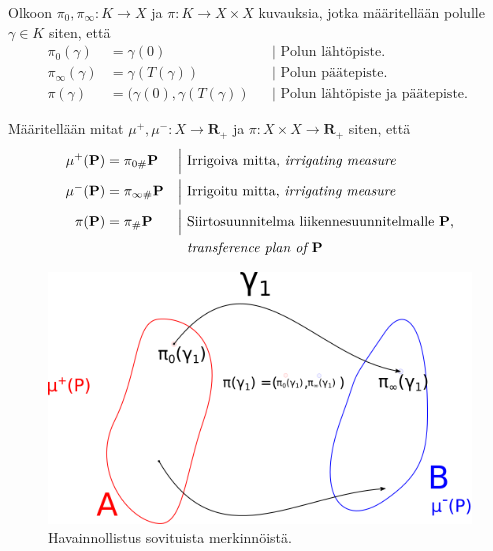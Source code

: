 \begin{definition}
    Olkoon $\pi_0, \pi_\infty: K\to X$ ja $\pi:K\to X \times X$ kuvauksia, jotka määritellään polulle $\gamma \in K$ siten, että 
    \begin{align*}
        \pi_0(\gamma) &= \gamma(0) &&\Big| \text{ Polun lähtöpiste. }\\
        \pi_\infty(\gamma) &= \gamma(T(\gamma)) &&\Big| \text{ Polun päätepiste. }\\
        \pi(\gamma) &= (\gamma(0), \gamma(T(\gamma)) &&\Big| \text{ Polun lähtöpiste ja päätepiste. }
    \end{align*}
\end{definition}

\begin{definition}
    Määritellään mitat $\mu^+, \mu^- : X \to \mathbf{R}_+$ ja $\pi: X\times X \to \mathbf{R}_+$ siten, että
    \begin{align*}
        \mu^+(\P) &= \pi_{0\#} \P  &&\Big| \text{ Irrigoiva mitta, \textit{irrigating measure} }\\
        \mu^-(\P) &= \pi_{\infty \#} \P  &&\Big| \text{ Irrigoitu mitta, \textit{irrigating measure} }\\
        \pi(\P) &= \pi_\# \P  &&\Big| \text{ Siirtosuunnitelma liikennesuunnitelmalle $\P$,}\\ 
        & &&\hphantom{\Big|} \text{ \textit{transference plan of $\P$}}
    \end{align*}
\end{definition}

\begin{figure}
    \centering
    \includegraphics[scale=0.8]{graphics/irrigoiva-ja-irrigoitu-mitta.png}
    \caption{Havainnollistus sovituista merkinnöistä.}
    \label{fig:my_label}
\end{figure}


